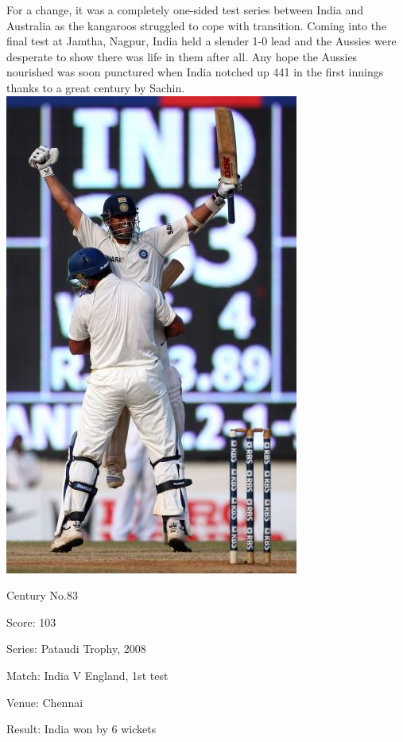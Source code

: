 \documentclass[11pt, a4paper]{article}
\begin{document}
For a change, it was a completely one-sided test series between India and Australia as the kangaroos struggled to cope with transition. Coming into the final test at Jamtha, Nagpur, India held a slender 1-0 lead and the Aussies were desperate to show there was life in them after all. Any hope the Aussies nourished was soon punctured when India notched up 441 in the first innings thanks to a great century by Sachin.
\newpage
\includegraphics[height=0.75\textheight]{pics/83.jpg}

Century No.83 

Score: 103 

Series: Pataudi Trophy, 2008 

Match: India V England, 1st test 

Venue: Chennai 

Result: India won by 6 wickets 
\end{document}

